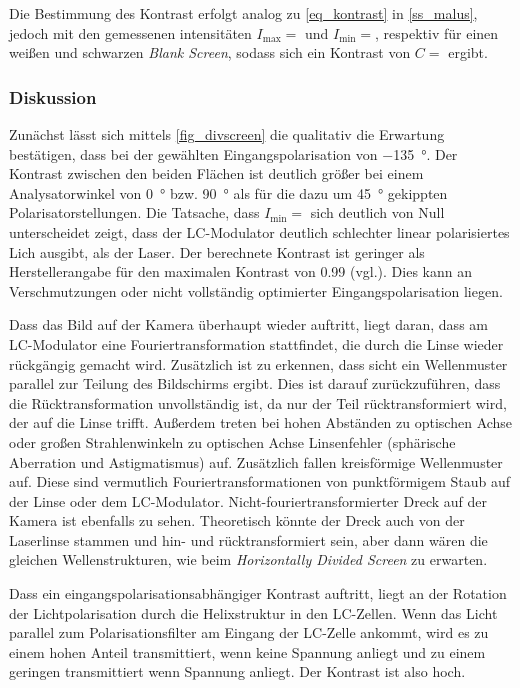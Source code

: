 \documentclass[
	a4paper,
	12pt,
	pagesize,
	ngerman
]{scrartcl}
\begin{document}
		Die Bestimmung des Kontrast erfolgt analog zu \cref{eq_kontrast} in \cref{ss_malus}, jedoch mit  den gemessenen intensitäten $I_\text{max}=$ und $I_\text{min}=$, respektiv für einen weißen und schwarzen \textit{Blank Screen}, sodass sich ein Kontrast von $C=$ ergibt.
			\subsubsection*{Diskussion}
			Zunächst lässt sich mittels \cref{fig_divscreen} die qualitativ die Erwartung bestätigen, dass bei der gewählten Eingangspolarisation von \SI{-135}{\degree}.
			Der Kontrast zwischen den beiden Flächen ist deutlich größer bei einem Analysatorwinkel von \SI{0}{\degree} bzw. \SI{90}{\degree} als für die dazu um \SI{45}{\degree} gekippten Polarisatorstellungen.
			Die Tatsache, dass $I_\text{min} = $ sich deutlich von Null unterscheidet zeigt, dass der LC-Modulator deutlich schlechter linear polarisiertes Lich ausgibt, als der Laser.
			Der berechnete Kontrast ist geringer als Herstellerangabe für den maximalen Kontrast von \SI{0,99}{} (vgl.\cite{Handbuch}).
			Dies kann an Verschmutzungen oder nicht vollständig optimierter Eingangspolarisation liegen.

			Dass das Bild auf der Kamera überhaupt wieder auftritt, liegt daran, dass am LC-Modulator eine Fouriertransformation stattfindet, die durch die Linse wieder rückgängig gemacht wird.
			Zusätzlich ist zu erkennen, dass sicht ein Wellenmuster parallel zur Teilung des Bildschirms ergibt.
			Dies ist darauf zurückzuführen, dass die Rücktransformation unvollständig ist, da nur der Teil rücktransformiert wird, der auf die Linse trifft.
			Außerdem treten bei hohen Abständen zu optischen Achse oder großen Strahlenwinkeln zu optischen Achse Linsenfehler (sphärische Aberration und Astigmatismus) auf.
			Zusätzlich fallen kreisförmige Wellenmuster auf.
			Diese sind vermutlich Fouriertransformationen von punktförmigem Staub auf der Linse oder dem LC-Modulator.
			Nicht-fouriertransformierter Dreck auf der Kamera ist ebenfalls zu sehen.
			Theoretisch könnte der Dreck auch von der Laserlinse stammen und hin- und rücktransformiert sein, aber dann wären die gleichen Wellenstrukturen, wie beim \textit{Horizontally Divided Screen} zu erwarten.

			Dass ein eingangspolarisationsabhängiger Kontrast auftritt, liegt an der Rotation der Lichtpolarisation durch die Helixstruktur in den LC-Zellen.
			Wenn das Licht parallel zum Polarisationsfilter am Eingang der LC-Zelle ankommt, wird es zu einem hohen Anteil transmittiert, wenn keine Spannung anliegt und zu einem geringen transmittiert wenn Spannung anliegt.
			Der Kontrast ist also hoch.
\end{document}

